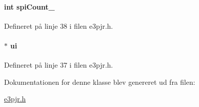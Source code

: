 \paragraph[{\texorpdfstring{spi\+Count\+\_\+}{spiCount_}}]{\setlength{\rightskip}{0pt plus 5cm}int spi\+Count\+\_\+\hspace{0.3cm}{\ttfamily [private]}}\hypertarget{class_e3_p_j_r_ab3c3e25d51904424592449e6dd0d813f}{}\label{class_e3_p_j_r_ab3c3e25d51904424592449e6dd0d813f}


Defineret på linje 38 i filen e3pjr.\+h.

\paragraph[{\texorpdfstring{ui}{ui}}]{$\ast$ ui\hspace{0.3cm}{\ttfamily [private]}}\hypertarget{class_e3_p_j_r_a253979c6b115fd717a42bc24d84427c5}{}\label{class_e3_p_j_r_a253979c6b115fd717a42bc24d84427c5}


Defineret på linje 37 i filen e3pjr.\+h.



Dokumentationen for denne klasse blev genereret ud fra filen\+:\begin{DoxyCompactItemize}
\item 
\hyperlink{e3pjr_8h}{e3pjr.\+h}\end{DoxyCompactItemize}
